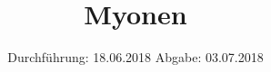 

\subject{V01}
\title{Myonen}
\date{
\centering
  Durchführung: 18.06.2018
  \hspace{3em}
  Abgabe: 03.07.2018
}



\maketitle
\thispagestyle{empty}
\tableofcontents
\newpage



%




\printbibliography


